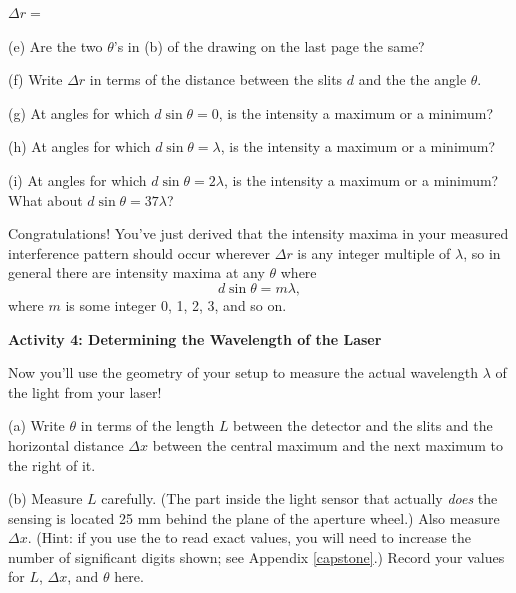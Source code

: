 \vspace{0.1in}
\hspace{0.8in}$\Delta r=$
\vspace{0.1in}

(e) Are the two $\theta$'s in (b) of the drawing on the last page the same?
\answerspace{0.2in}

(f) Write $\Delta r$ in terms of the distance between the slits $d$ and the the angle $\theta$.
\answerspace{0.4in}

(g) At angles for which $d \sin \theta = 0$, is the intensity a maximum or a minimum?
\answerspace{0.2in}

(h) At angles for which $d \sin \theta = \lambda$, is the intensity a maximum or a minimum?
\answerspace{0.2in}

(i) At angles for which $d \sin \theta = 2 \lambda$, is the intensity a maximum or a minimum?  What about $d \sin \theta = 37 \lambda$?
\answerspace{0.2in}

Congratulations!  You've just derived that the intensity maxima in your measured interference pattern should occur wherever $\Delta r$ is any integer multiple of $\lambda$, so in general there are intensity maxima at any $\theta$ where
\begin{equation}
d \sin \theta = m \lambda,
\end{equation}
where $m$ is some integer 0, 1, 2, 3, and so on.  



\pagebreak[3]
\textbf{Activity 4: Determining the Wavelength of the Laser }

Now you'll use the geometry of your setup to measure the actual wavelength $\lambda$ of the light from your laser!




(a) Write $\theta$ in terms of the length $L$ between the detector and the slits and the horizontal distance $\Delta x$ between the central maximum and the next maximum to the right of it.
\answerspace{0.4in}

(b) Measure $L$ carefully.  (The part inside the light sensor that actually \textit{does} the sensing is located 25 mm behind the plane of the aperture wheel.)  
Also measure $\Delta x$.  (Hint: if you use the  to read exact values, you will need to increase the number of significant digits shown; see Appendix \ref{capstone}.)
Record your values for $L$, $\Delta x$, and $\theta$ here.

\answerspace{0.8in}

